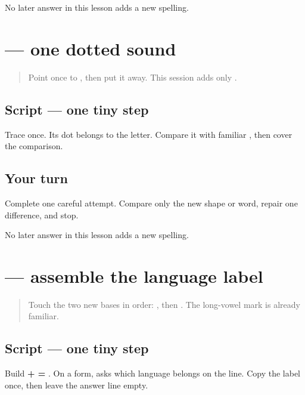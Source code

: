 \begin{tcolorbox}[breakable,colback=teal!4,colframe=teal!35!black,title={Before you move on}]
No later answer in this lesson adds a new spelling.
\end{tcolorbox}
\section[\texorpdfstring{\pa{ਸ਼} (sha)}{ਸ਼ (sha)}]{ — one dotted sound}

\label{lesson:PA-W03-sha}



\begin{quote}
Point once to \textbf{}, then put it away. This session adds only \textbf{}.
\end{quote}

\subsection*{Script — one tiny step}
Trace \textbf{} once. Its dot belongs to the letter. Compare it with familiar \textbf{}, then cover the comparison.

\subsection*{Your turn}
Complete one careful attempt. Compare only the new shape or word, repair one difference, and stop.

\begin{tcolorbox}[breakable,colback=teal!4,colframe=teal!35!black,title={Before you move on}]
No later answer in this lesson adds a new spelling.
\end{tcolorbox}
\section[\texorpdfstring{\pa{ਭਾਸ਼ਾ} (bhāshā)}{ਭਾਸ਼ਾ (bhāshā)}]{ — assemble the language label}

\label{lesson:PA-W03-language-label}



\begin{quote}
Touch the two new bases in order: \textbf{}, then \textbf{}. The long-vowel mark is already familiar.
\end{quote}

\subsection*{Script — one tiny step}
Build \textbf{ +  = }. On a form, \textbf{} asks which language belongs on the line. Copy the label once, then leave the answer line empty.


